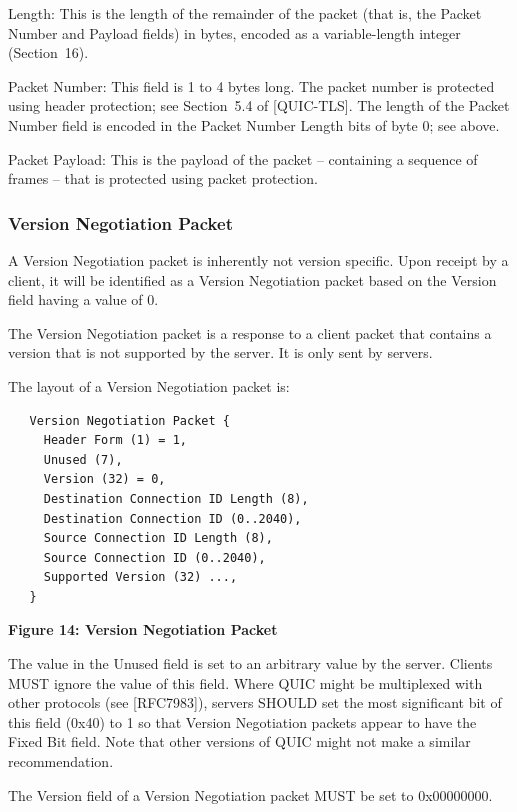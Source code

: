 \documentclass{article}
\begin{document}
Length:  This is the length of the remainder of the packet (that is, the Packet Number and Payload fields) in bytes, encoded as a variable-length integer (Section~16).

Packet Number:  This field is 1 to 4 bytes long.  The packet number is protected using header protection; see Section~5.4 of [QUIC-TLS].  The length of the Packet Number field is encoded in the Packet Number Length bits of byte 0; see above.

Packet Payload:  This is the payload of the packet -- containing a sequence of frames -- that is protected using packet protection.

\subsubsection{Version Negotiation Packet}

A Version Negotiation packet is inherently not version specific. Upon receipt by a client, it will be identified as a Version Negotiation packet based on the Version field having a value of 0.

The Version Negotiation packet is a response to a client packet that contains a version that is not supported by the server.  It is only sent by servers.

The layout of a Version Negotiation packet is:

\begin{verbatim}
   Version Negotiation Packet {
     Header Form (1) = 1,
     Unused (7),
     Version (32) = 0,
     Destination Connection ID Length (8),
     Destination Connection ID (0..2040),
     Source Connection ID Length (8),
     Source Connection ID (0..2040),
     Supported Version (32) ...,
   }
\end{verbatim}

\begin{center}
\textbf{Figure 14: Version Negotiation Packet}
\end{center}

The value in the Unused field is set to an arbitrary value by the server.  Clients MUST ignore the value of this field.  Where QUIC might be multiplexed with other protocols (see [RFC7983]), servers SHOULD set the most significant bit of this field (0x40) to 1 so that Version Negotiation packets appear to have the Fixed Bit field.  Note that other versions of QUIC might not make a similar recommendation.

The Version field of a Version Negotiation packet MUST be set to 0x00000000.
\end{document}
